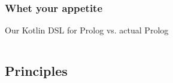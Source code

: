 \documentclass[presentation]{beamer}
\begin{document}
\begin{frame}%
\frametitle{Whet your appetite}

    Our Kotlin DSL for Prolog vs. actual Prolog

    \inputminted[fontsize=\tiny]{kotlin}{code/Relatives.kt}

\end{frame}

\subsection{Principles}
\end{document}
